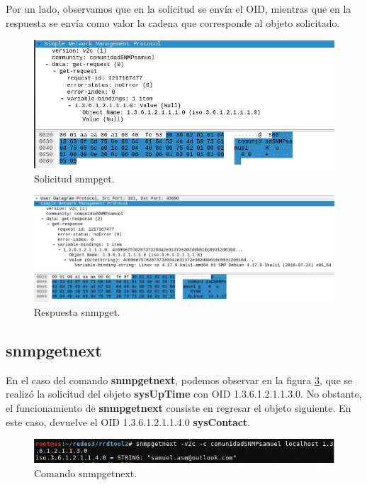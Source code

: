 Por un lado, observamos que en la solicitud se envía el OID, mientras que en la respuesta se envía como valor la cadena que corresponde al objeto solicitado.

\FloatBarrier
\begin{figure}[htbp!]
		\centering
			\includegraphics[width=.9 \textwidth]{images/snmpget3}
		\caption{Solicitud snmpget.}
		\label{image:snmpget3}
\end{figure}
\FloatBarrier

\FloatBarrier
\begin{figure}[htbp!]
		\centering
			\includegraphics[width=.9 \textwidth]{images/snmpget4}
		\caption{Respuesta snmpget.}
		\label{image:snmpget4}
\end{figure}
\FloatBarrier

\subsection{snmpgetnext}

En el caso del comando \textbf{snmpgetnext}, podemos observar en la figura \ref{image:snmpgetnext1}, que se realizó la solicitud del objeto \textbf{sysUpTime} con OID 1.3.6.1.2.1.1.3.0. No obstante, el funcionamiento de \textbf{snmpgetnext} consiste en regresar el objeto siguiente. En este caso, devuelve el OID 1.3.6.1.2.1.1.4.0 \textbf{sysContact}.

\FloatBarrier
\begin{figure}[htbp!]
		\centering
			\includegraphics[width=.9 \textwidth]{images/snmpgetnext1}
		\caption{Comando snmpgetnext.}
		\label{image:snmpgetnext1}
\end{figure}
\FloatBarrier

